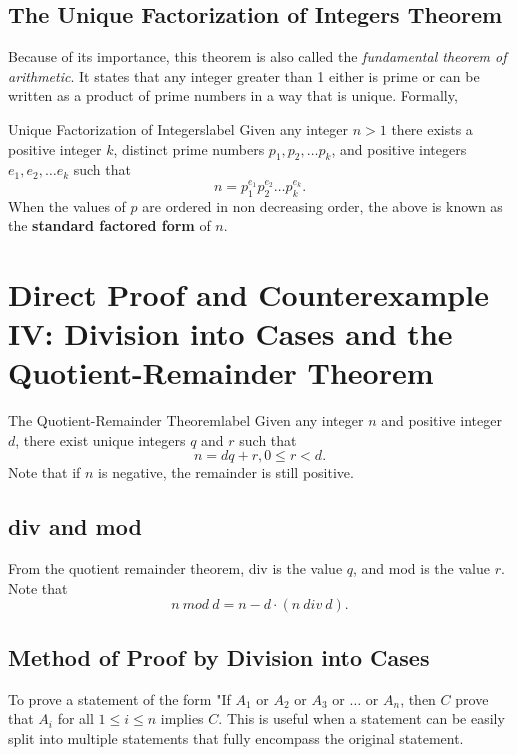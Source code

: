 \documentclass[a4paper]{report}
\begin{document}
\subsection{The Unique Factorization of Integers Theorem}

Because of its importance, this theorem is also called the \emph{fundamental theorem of arithmetic}.
It states that any integer greater than 1 either is prime or can be written as a product of
prime numbers in a way that is unique. Formally,

\begin{theorem}{Unique Factorization of Integers}{label}
    Given any integer $n > 1$ there exists a positive integer $k$, distinct prime numbers
    $p_1, p_2, \ldots p_k$, and positive integers $e_1,e_2, \ldots e_k$ such that \[
        n = p_1^{e_1} p_2^{e_2} \ldots p_k^{e_k}
    .\] 
    When the values of $p$ are ordered in non decreasing order, the above is known as the
    \textbf{standard factored form} of $n$.
\end{theorem}

\section{Direct Proof and Counterexample IV: Division into Cases and the Quotient-Remainder Theorem}

\begin{theorem}{The Quotient-Remainder Theorem}{label}
    Given any integer $n$ and positive integer $d$, there exist unique integers $q$ and $r$ such that
    \[
    n = dq + r, 0 \le r < d
    .\] 
    Note that if $n$ is negative, the remainder is still positive.
\end{theorem}

\subsection{div and mod}

From the quotient remainder theorem, div is the value $q$, and mod is the value $r$. Note that \[
    n \: mod \: d = n - d \cdot (n \: div \: d)
.\] 

\subsection{Method of Proof by Division into Cases}

To prove a statement of the form "If $A_1$ or $A_2$ or $A_3$ or $\ldots$ or $A_n$, then $C$ prove that
$A_i$ for all $1 \le i \le n$ implies $C$. This is useful when a statement can be easily split
into multiple statements that fully encompass the original statement.
\end{document}
